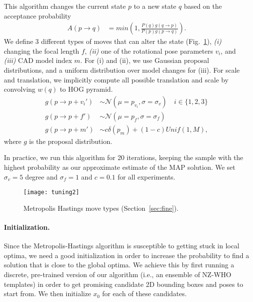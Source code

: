 This algorithm changes the current state $p$ to a new state $q$ based
on the acceptance probability
\begin{align}
    A(p \rightarrow q) & =  min\left( 1,  \frac{P(q) g(q \rightarrow p)}{P(p) g(p \rightarrow q)}\right).
\end{align}
We define $3$ different types of moves that can alter the state
(Fig.~\ref{fig:moves}), {\em (i)} changing the focal length $f$, {\em
(ii)} one of the rotational pose parameters $v_i$, and {\em (iii)} CAD model
index $m$. For (i) and (ii), we use Gaussian proposal distributions, and a uniform
distribution over model changes for (iii). For scale and translation, we
implicitly compute all possible translation and scale by convolving $w(q)$ to
HOG pyramid.
\begin{align}
    g(p \rightarrow p + v_i') & \sim \mathcal{N}(\mu = p_{v_i},\sigma = \sigma_v) \quad i \in \{1,2,3\}\\
    g(p \rightarrow p + f') & \sim \mathcal{N}(\mu = p_{f},\sigma = \sigma_f)\\
    g(p \rightarrow p + m') & \sim c \delta(p_m) + (1-c) Unif(1,M),
\end{align}
where $g$ is the proposal distribution. %
%

In practice, we run this algorithm for 20 iterations, keeping
the sample with the highest probability as our approximate estimate of
the MAP solution. We set $\sigma_v = 5$ degree and $\sigma_f = 1$ and
$c = 0.1$ for all experiments.

\begin{figure}[t]
\centering
    \texttt{[image: tuning2]} \\ [-5pt]
    \caption{Metropolis Hastings move types (Section~\ref{sec:fine}).}
 \label{fig:moves}
\end{figure}


\paragraph{Initialization.}
Since the Metropolis-Hastings algorithm is susceptible to getting
stuck in local optima, we need a good initialization in order to
increase the probability to find a solution that is close to the
global optima. We achieve this by first running a discrete,
pre-trained version of our algorithm (i.e., an ensemble of NZ-WHO
templates) in order to get promising candidate 2D bounding boxes and
poses to start from. We then initialize $x_0$ for each of these candidates.
